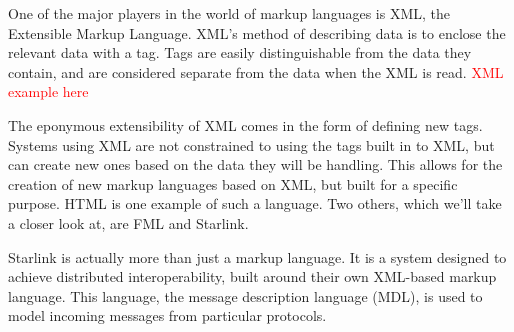 \documentclass{sig-alternate}
\newcommand{\mycomment}[1]{\textcolor{red}{#1}}
\begin{document}
One of the major players in the world of markup languages is XML, the Extensible Markup Language. XML's method of describing data is to enclose the relevant data with a tag. Tags are easily distinguishable from the data they contain, and are considered separate from the data when the XML is read. 
\mycomment{XML example here}

The eponymous extensibility of XML comes in the form of defining new tags. Systems using XML are not constrained to using the tags built in to XML, but can create new ones based on the data they will be handling. This allows for the creation of new markup languages based on XML, but built for a specific purpose. HTML is one example of such a language. Two others, which we'll take a closer look at, are FML and Starlink.

Starlink \cite{Bromberg:2011} is actually more than just a markup language. It is a system designed to achieve distributed interoperability, built around their own XML-based markup language. This language, the message description language (MDL), is used to model incoming messages from particular protocols.
\end{document}

